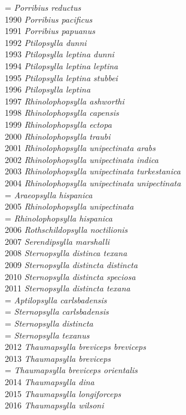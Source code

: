 \documentclass[
]{article}
\begin{document}
= \emph{Porribius reductus}\\
1990 \emph{Porribius pacificus}\\
1991 \emph{Porribius papuanus}\\
1992 \emph{Ptilopsylla dunni}\\
1993 \emph{Ptilopsylla leptina dunni}\\
1994 \emph{Ptilopsylla leptina leptina}\\
1995 \emph{Ptilopsylla leptina stubbei}\\
1996 \emph{Ptilopsylla leptina}\\
1997 \emph{Rhinolophopsylla ashworthi}\\
1998 \emph{Rhinolophopsylla capensis}\\
1999 \emph{Rhinolophopsylla ectopa}\\
2000 \emph{Rhinolophopsylla traubi}\\
2001 \emph{Rhinolophopsylla unipectinata arabs}\\
2002 \emph{Rhinolophopsylla unipectinata indica}\\
2003 \emph{Rhinolophopsylla unipectinata turkestanica}\\
2004 \emph{Rhinolophopsylla unipectinata unipectinata}\\
= \emph{Araeopsylla hispanica}\\
2005 \emph{Rhinolophopsylla unipectinata}\\
= \emph{Rhinolophopsylla hispanica}\\
2006 \emph{Rothschildopsylla noctilionis}\\
2007 \emph{Serendipsylla marshalli}\\
2008 \emph{Sternopsylla distinca texana}\\
2009 \emph{Sternopsylla distincta distincta}\\
2010 \emph{Sternopsylla distincta speciosa}\\
2011 \emph{Sternopsylla distincta texana}\\
= \emph{Aptilopsylla carlsbadensis}\\
= \emph{Sternopsylla carlsbadensis}\\
= \emph{Sternopsylla distincta}\\
= \emph{Sternopsylla texanus}\\
2012 \emph{Thaumapsylla breviceps breviceps}\\
2013 \emph{Thaumapsylla breviceps}\\
= \emph{Thaumapsylla breviceps orientalis}\\
2014 \emph{Thaumapsylla dina}\\
2015 \emph{Thaumapsylla longiforceps}\\
2016 \emph{Thaumapsylla wilsoni}
\end{document}
